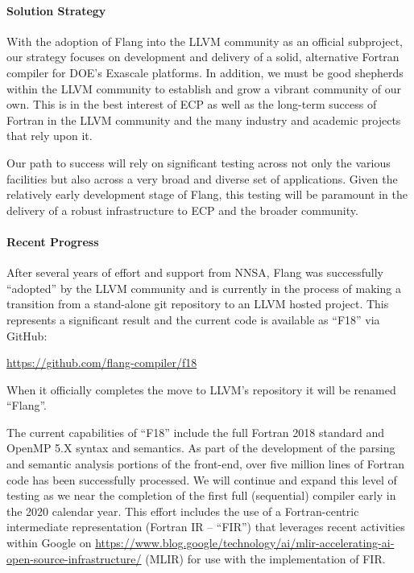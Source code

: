 \paragraph{Solution Strategy}

With the adoption of Flang into the LLVM community as an official subproject,
our strategy focuses on development and delivery of a solid, alternative Fortran
compiler for DOE's Exascale platforms.  In addition, we must be good shepherds
within the LLVM community to establish and grow a vibrant community of our own. This is
in the best interest of ECP as well as the long-term success of Fortran in the
LLVM community and the many industry and academic projects that rely upon it. 

Our path to success will rely on significant testing across not only
the various facilities but also across a very broad and diverse set of applications.
Given the relatively early development stage of Flang, this testing will be paramount 
in the delivery of a robust infrastructure to ECP and the broader community. 

\paragraph{Recent Progress}

After several years of effort and support from NNSA, Flang was successfully ``adopted''
by the LLVM community and is currently in the process of making a transition from a
stand-alone git repository to an LLVM hosted project.  This represents a significant
result and the current code is available as ``F18'' via GitHub:

\begin{center}
\url{https://github.com/flang-compiler/f18}
\end{center}

When it officially completes the move to LLVM's repository it will be renamed ``Flang''. 

The current capabilities of ``F18'' include the full Fortran 2018
standard and OpenMP 5.X syntax and semantics.  As part of the
development of the parsing and semantic analysis portions of the
front-end, over five million lines of Fortran code has been
successfully processed. We will continue and expand this level of
testing as we near the completion of the first full (sequential)
compiler early in the 2020 calendar year.  This effort includes the
use of a Fortran-centric intermediate representation (Fortran IR --
``FIR'') that leverages recent activities within Google
on \href{Multi-Level Intermediate Representations}
{https://www.blog.google/technology/ai/mlir-accelerating-ai-open-source-infrastructure/}
(MLIR) for use with the implementation of FIR.

